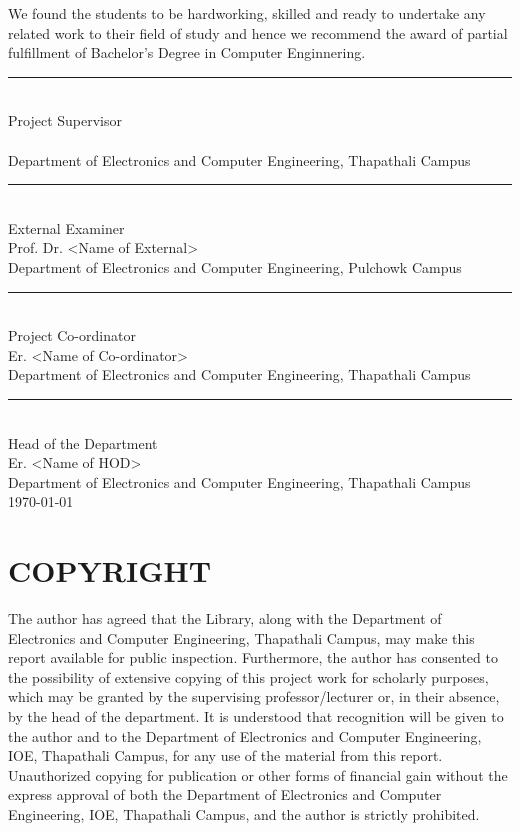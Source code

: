 \documentclass{ioereport}
\begin{document}
    We found the students to be hardworking, skilled and ready to undertake any related work to their field of study and hence we recommend the award of partial fulfillment of Bachelor's Degree in Computer Enginnering.\\
    
    \rule{0.5\linewidth}{0.4pt}\\
    Project Supervisor\\
    \supervisorname\\
    Department of Electronics and Computer Engineering, Thapathali Campus\\

    \rule{0.5\linewidth}{0.4pt} \\
    External Examiner \\
    Prof. Dr. \textless Name of External\textgreater\\
    Department of Electronics and Computer Engineering, Pulchowk Campus\\

    \rule{0.5\linewidth}{0.4pt} \\
    Project Co-ordinator\\
    Er. \textless Name of Co-ordinator\textgreater \\
    Department of Electronics and Computer Engineering, Thapathali Campus\\

    \rule{0.5\linewidth}{0.4pt} \\
    Head of the Department \\ 
    Er. \textless Name of HOD\textgreater \\ 
    Department of Electronics and Computer Engineering, Thapathali Campus\\

    \today

    \pagebreak
    \fi

\iffalse
\section*{COPYRIGHT}
    The author has agreed that the Library, along with the Department of Electronics and Computer Engineering, Thapathali Campus, may make this report available for public inspection. Furthermore, the author has consented to the possibility of extensive copying of this project work for scholarly purposes, which may be granted by the supervising professor/lecturer or, in their absence, by the head of the department. It is understood that recognition will be given to the author and to the Department of Electronics and Computer Engineering, IOE, Thapathali Campus, for any use of the material from this report. Unauthorized copying for publication or other forms of financial gain without the express approval of both the Department of Electronics and Computer Engineering, IOE, Thapathali Campus, and the author is strictly prohibited.
\end{document}
